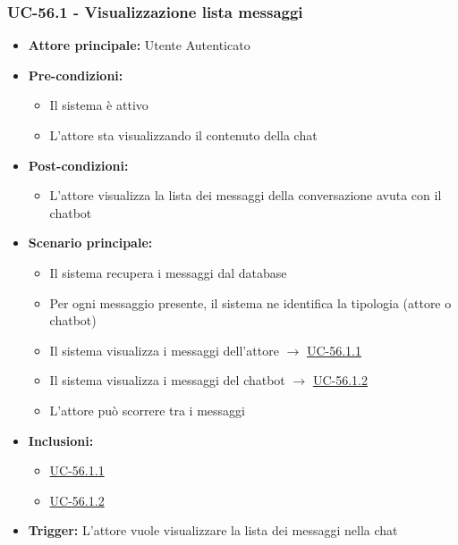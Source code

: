 \documentclass[a4paper,12pt]{article}
\begin{document}
\subsubsection{UC-56.1 - Visualizzazione lista messaggi} \label{subsec:UC-56.1}
\begin{itemize}
    \item \textbf{Attore principale:} Utente Autenticato
    \item \textbf{Pre-condizioni:} 
    \begin{itemize}
        \item Il sistema è attivo
        \item L'attore sta visualizzando il contenuto della chat
    \end{itemize}
    \item \textbf{Post-condizioni:}
    \begin{itemize}
        \item L'attore visualizza la lista dei messaggi della conversazione avuta con il chatbot
    \end{itemize}
    \item \textbf{Scenario principale:} 
    \begin{itemize}
        \item Il sistema recupera i messaggi dal database
        \item Per ogni messaggio presente, il sistema ne identifica la tipologia (attore o chatbot)
        \item Il sistema visualizza i messaggi dell'attore $\rightarrow$ \hyperref[subsec:UC-56.1.1]{UC-56.1.1}
        \item Il sistema visualizza i messaggi del chatbot $\rightarrow$ \hyperref[subsec:UC-56.1.2]{UC-56.1.2}
        \item L'attore può scorrere tra i messaggi
    \end{itemize}
    \item \textbf{Inclusioni:}
    \begin{itemize}
        \item \hyperref[subsec:UC-56.1.1]{UC-56.1.1}
        \item \hyperref[subsec:UC-56.1.2]{UC-56.1.2}
    \end{itemize}
    \item \textbf{Trigger:} L'attore vuole visualizzare la lista dei messaggi nella chat
\end{itemize}
\end{document}

